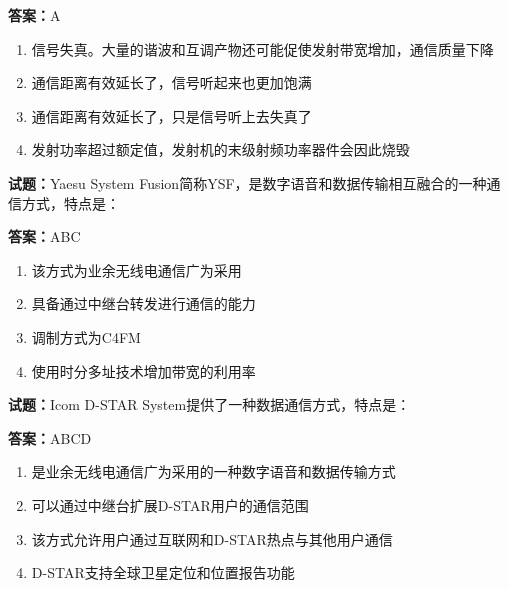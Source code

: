 \documentclass{ctexbook}
\begin{document}
\textbf{答案：}A 

\begin{enumerate}[leftmargin=3em]
  \item 信号失真。大量的谐波和互调产物还可能促使发射带宽增加，通信质量下降 

  \item 通信距离有效延长了，信号听起来也更加饱满 

  \item 通信距离有效延长了，只是信号听上去失真了 

  \item 发射功率超过额定值，发射机的末级射频功率器件会因此烧毁 

\end{enumerate}





\vspace{1em}

\textbf{试题：}Yaesu System Fusion简称YSF，是数字语音和数据传输相互融合的一种通信方式，特点是： 

\textbf{答案：}ABC 

\begin{enumerate}[leftmargin=3em]
  \item 该方式为业余无线电通信广为采用 

  \item 具备通过中继台转发进行通信的能力 

  \item 调制方式为C4FM 

  \item 使用时分多址技术增加带宽的利用率 

\end{enumerate}





\vspace{1em}

\textbf{试题：}Icom D-STAR System提供了一种数据通信方式，特点是： 

\textbf{答案：}ABCD 

\begin{enumerate}[leftmargin=3em]
  \item 是业余无线电通信广为采用的一种数字语音和数据传输方式 

  \item 可以通过中继台扩展D-STAR用户的通信范围 

  \item 该方式允许用户通过互联网和D-STAR热点与其他用户通信 

  \item D-STAR支持全球卫星定位和位置报告功能 

\end{enumerate}
\end{document}

